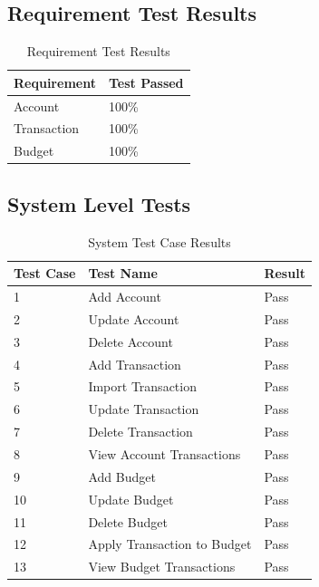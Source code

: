 \documentclass[12pt]{article}
\begin{document}
\subsection {Requirement Test Results}
\begin{table}[htbp]
\centering
\caption {Requirement Test Results}
\label{test-result}
\begin{tabularx}{\textwidth}{ | l | X |}
\hline
\textbf{Requirement}  &\textbf{Test Passed}   \\ \hline
Account & 100\% 				\\ \hline
Transaction & 100\%			\\ \hline
Budget & 100\%				\\ \hline
\end{tabularx}
\end{table}

\subsection{System Level Tests}
\begin{table}[htbp]
\centering
\caption {System Test Case Results}
\label{test-result}
\begin{tabularx}{\textwidth}{ | l | X | l |}
\hline
\textbf{Test Case}  &\textbf {Test Name}   &  \textbf{Result}                         \\ \hline
1 & Add Account &  Pass				\\ \hline
2 & Update Account & Pass 			\\ \hline
3 & Delete Account & Pass				\\ \hline
4 & Add Transaction & Pass			\\ \hline
5 & Import Transaction &	Pass	 		\\ \hline
6 & Update Transaction &	Pass			\\ \hline
7 & Delete Transaction & 	Pass			\\ \hline
8 & View Account Transactions & Pass		 \\ \hline
9 & Add Budget & Pass				\\ \hline
10 & Update Budget & Pass			\\ \hline
11 & Delete Budget & Pass				\\ \hline
12 & Apply Transaction to Budget & Pass	\\ \hline
13 & View Budget Transactions & Pass		\\ \hline
\end{tabularx}
\end{table}
\clearpage
\end{document}
